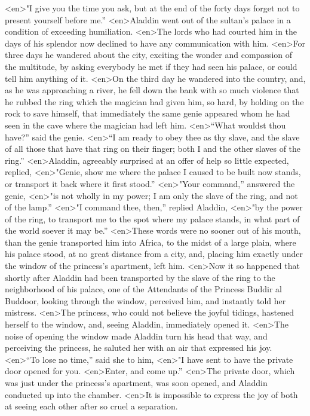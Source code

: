 <en>"I give you the time you ask, but at the end of the forty days forget not to present yourself before me.”
<en>Aladdin went out of the sultan’s palace in a condition of exceeding humiliation.
<en>The lords who had courted him in the days of his splendor now declined to have any communication with him.
<en>For three days he wandered about the city, exciting the wonder and compassion of the multitude, by asking everybody he met if they had seen his palace, or could tell him anything of it.
<en>On the third day he wandered into the country, and, as he was approaching a river, he fell down the bank with so much violence that he rubbed the ring which the magician had given him, so hard, by holding on the rock to save himself, that immediately the same genie appeared whom he had seen in the cave where the magician had left him.
<en>“What wouldst thou have?” said the genie.
<en>“I am ready to obey thee as thy slave, and the slave of all those that have that ring on their finger; both I and the other slaves of the ring.”
<en>Aladdin, agreeably surprised at an offer of help so little expected, replied,
<en>"Genie, show me where the palace I caused to be built now stands, or transport it back where it first stood.”
<en>"Your command,” answered the genie,
<en>"is not wholly in my power; I am only the slave of the ring, and not of the lamp.”
<en>"I command thee, then,” replied Aladdin,
<en>"by the power of the ring, to transport me to the spot where my palace stands, in what part of the world soever it may be.”
<en>These words were no sooner out of his mouth, than the genie transported him into Africa, to the midst of a large plain, where his palace stood, at no great distance from a city, and, placing him exactly under the window of the princess’s apartment, left him.
<en>Now it so happened that shortly after Aladdin had been transported by the slave of the ring to the neighborhood of his palace, one of the Attendants of the Princess Buddir al Buddoor, looking through the window, perceived him, and instantly told her mistress.
<en>The princess, who could not believe the joyful tidings, hastened herself to the window, and, seeing Aladdin, immediately opened it.
<en>The noise of opening the window made Aladdin turn his head that way, and perceiving the princess, he saluted her with an air that expressed his joy.
<en>“To lose no time,” said she to him,
<en>"I have sent to have the private door opened for you.
<en>Enter, and come up.”
<en>The private door, which was just under the princess’s apartment, was soon opened, and Aladdin conducted up into the chamber.
<en>It is impossible to express the joy of both at seeing each other after so cruel a separation.
